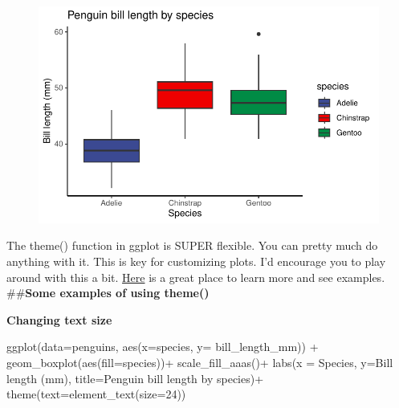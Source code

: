 \documentclass[
  letterpaper,
  DIV=11,
  numbers=noendperiod]{scrartcl}
\newenvironment{Shaded}{\begin{snugshade}}{\end{snugshade}}
\newcommand{\AttributeTok}[1]{\textcolor[rgb]{0.40,0.45,0.13}{#1}}
\newcommand{\DecValTok}[1]{\textcolor[rgb]{0.68,0.00,0.00}{#1}}
\newcommand{\FunctionTok}[1]{\textcolor[rgb]{0.28,0.35,0.67}{#1}}
\newcommand{\NormalTok}[1]{\textcolor[rgb]{0.00,0.23,0.31}{#1}}
\newcommand{\SpecialCharTok}[1]{\textcolor[rgb]{0.37,0.37,0.37}{#1}}
\newcommand{\StringTok}[1]{\textcolor[rgb]{0.13,0.47,0.30}{#1}}
\begin{document}
\begin{figure}[H]

{\centering \includegraphics{Lab_2_files/figure-pdf/unnamed-chunk-43-1.pdf}

}

\end{figure}

The theme() function in ggplot is SUPER flexible. You can pretty much do
anything with it. This is key for customizing plots. I'd encourage you
to play around with this a bit.
\href{https://ggplot2.tidyverse.org/reference/theme.html}{Here} is a
great place to learn more and see examples.\\
\#\#\textbf{Some examples of using theme()}

\textbf{Changing text size}

\begin{Shaded}
\begin{Highlighting}[]
\FunctionTok{ggplot}\NormalTok{(}\AttributeTok{data=}\NormalTok{penguins, }\FunctionTok{aes}\NormalTok{(}\AttributeTok{x=}\NormalTok{species, }\AttributeTok{y=}\NormalTok{ bill\_length\_mm)) }\SpecialCharTok{+}
  \FunctionTok{geom\_boxplot}\NormalTok{(}\FunctionTok{aes}\NormalTok{(}\AttributeTok{fill=}\NormalTok{species))}\SpecialCharTok{+}
  \FunctionTok{scale\_fill\_aaas}\NormalTok{()}\SpecialCharTok{+}
  \FunctionTok{labs}\NormalTok{(}\AttributeTok{x =} \StringTok{\textquotesingle{}Species\textquotesingle{}}\NormalTok{, }\AttributeTok{y=}\StringTok{\textquotesingle{}Bill length (mm)\textquotesingle{}}\NormalTok{, }\AttributeTok{title=}\StringTok{\textquotesingle{}Penguin bill length by species\textquotesingle{}}\NormalTok{)}\SpecialCharTok{+}
  \FunctionTok{theme}\NormalTok{(}\AttributeTok{text=}\FunctionTok{element\_text}\NormalTok{(}\AttributeTok{size=}\DecValTok{24}\NormalTok{))}
\end{Highlighting}
\end{Shaded}
\end{document}
